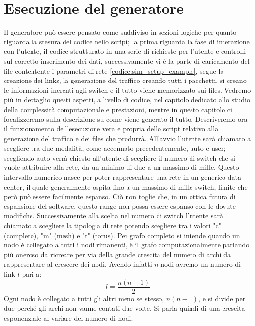 \documentclass[binding=0.6cm]{sapthesis}
\begin{document}
\section{Esecuzione del generatore}
\label{sec:esecuzione_del_generatore}
Il generatore può essere pensato come suddiviso in sezioni logiche per quanto riguarda la stesura del codice nello script; la prima riguarda la fase
di interazione con l'utente, il codice  strutturato in una serie di richieste per l'utente e controlli sul corretto inserimento dei dati, successivamente
vi è la parte di caricamento del file contentente i parametri di rete \ref{codice:sim_setup_example}, segue la creazione dei links, la generazione del traffico
creando tutti i pacchetti, si creano le informazioni inerenti agli switch e il tutto viene memorizzato sui files. Vedremo più in dettaglio questi
aspetti, a livello di codice, nel capitolo dedicato allo studio della complessità computazionale e prestazioni, mentre in questo capitolo ci focalizzeremo
sulla descrizione su come viene generato il tutto.
Descriveremo ora il funzionamento dell'esecuzione vera e propria dello script relativo alla generazione del traffico e dei files che produrrà.
All'avvio l'utente sarà chiamato a scegliere tra due modalità, come accennato precedentemente, auto e user; scegliendo auto verrà chiesto all'utente
di scegliere il numero di switch che si vuole attribuire alla rete, da un minimo di due a un massimo di mille. Questo intervallo numerico nasce per
poter rappresentare una rete in un generico data center, il quale generalmente ospita fino a un massimo di mille switch, limite che però può essere facilmente espanso. Ciò non toglie che,
in un ottica futura di espansione del software, questo range non possa essere espanso con le dovute modifiche. Successivamente alla scelta nel numero
di switch l'utente sarà chiamato a scegliere la tipologia di rete potendo scegliere tra i valori "c" (completo), "m" (mesh) e "t" (torus). Per 
grafo completo
si intende quando un nodo è collegato a tutti i nodi rimanenti, è il grafo computazionalmente parlando più oneroso da ricreare per via 
della grande crescita
del numero di archi da rappresentare al crescere dei nodi. Avendo infatti \(n\) nodi avremo un numero di link \(l\) pari a:
\begin{equation}
    l = \frac{n(n-1)}{2}
    \label{eq:link_number}
\end{equation}
Ogni nodo è collegato a tutti gli altri meno se stesso, \(n(n-1)\), e si divide per due perché gli archi non vanno contati due volte. Si parla quindi di una crescita esponenziale al variare del numero di nodi.
\end{document}
